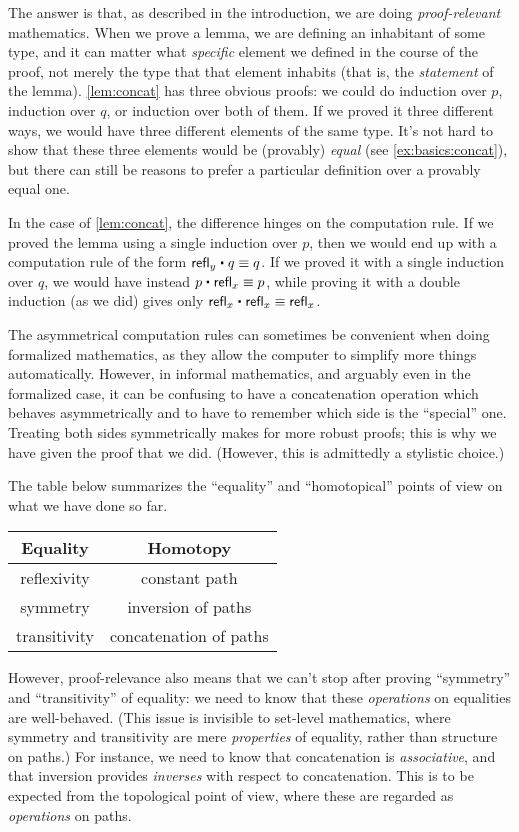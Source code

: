 The answer is that, as described in the introduction, we are doing \emph{proof-relevant} mathematics.
When we prove a lemma, we are defining an inhabitant of some type, and it can matter what \emph{specific} element we defined in the course of the proof, not merely the type that that element inhabits (that is, the \emph{statement} of the lemma).
\autoref{lem:concat} has three obvious proofs: we could do induction over $p$, induction over $q$, or induction over both of them.
If we proved it three different ways, we would have three different elements of the same type.
It's not hard to show that these three elements would be (provably) \emph{equal} (see \autoref{ex:basics:concat}), but there can still be reasons to prefer a particular definition over a provably equal one.

In the case of \autoref{lem:concat}, the difference hinges on the computation rule.
If we proved the lemma using a single induction over $p$, then we would end up with a computation rule of the form $\refl{y} \ct q \jdeq q$.
If we proved it with a single induction over $q$, we would have instead $p\ct\refl{x}\jdeq p$, while proving it with a double induction (as we did) gives only $\refl{x}\ct\refl{x} \jdeq \refl{x}$.

The asymmetrical computation rules can sometimes be convenient when doing formalized mathematics, as they allow the computer to simplify more things automatically.
However, in informal mathematics, and arguably even in the formalized case, it can be confusing to have a concatenation operation which behaves asymmetrically and to have to remember which side is the ``special'' one.
Treating both sides symmetrically makes for more robust proofs; this is why we have given the proof that we did.
(However, this is admittedly a stylistic choice.)

The table below summarizes the ``equality'' and ``homotopical'' points of view on what we have done so far.
\begin{center}
  \begin{tabular}{c|c}
    Equality & Homotopy \\\hline
    reflexivity & constant path\\
    symmetry & inversion of paths\\
    transitivity & concatenation of paths
  \end{tabular}
\end{center}

However, proof-relevance also means that we can't stop after proving ``symmetry'' and  ``transitivity'' of equality: we need to know that these \emph{operations} on equalities are well-behaved.
(This issue is invisible to set-level mathematics, where symmetry and transitivity are mere \emph{properties} of equality, rather than structure on paths.)
For instance, we need to know that concatenation is \emph{associative}, and that inversion provides \emph{inverses} with respect to concatenation.
This is to be expected from the topological point of view, where these are regarded as \emph{operations} on paths.

